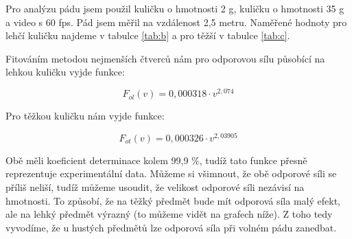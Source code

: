 \documentclass{fkssolpub}
\author{Ondřej Sedláček}
\begin{document}
 

Pro analýzu pádu jsem použil kuličku o hmotnosti 2 g, kuličku o hmotnosti
35 g a video s 60 fps. Pád jsem měřil na vzdálenost 2,5 metru. Naměřené
hodnoty pro lehčí kuličku najdeme v tabulce \ref{tab:b} a pro těžší v
tabulce \ref{tab:c}.

Fitováním metodou nejmenších čtverců nám pro odporovou sílu působící
na lehkou kuličku vyjde funkce:

\[
	F_{ol}(v) = 0{,}000318 \cdot v^{2{,}074}
\]

Pro těžkou kuličku nám vyjde funkce:

\[
	F_{ot}(v) = 0{,}000326 \cdot v^{2{,}03905}
\]

Obě měli koeficient determinace kolem 99{,}9 \%, tudíž tato funkce
přesně reprezentuje experimentální data. Můžeme si všimnout, že obě
odporové síli se příliš neliší, tudíž můžeme usoudit, že velikost
odporové síli nezávisí na hmotnosti. To způsobí, že na těžký předmět
bude mít odporová síla malý efekt, ale na lehký předmět výrazný (to
můžeme vidět na grafech níže). Z toho tedy vyvodíme, že u hustých předmětů
lze odporová síla při volném pádu zanedbat.
\end{document}
